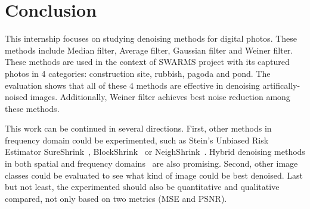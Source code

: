 \chapter{Conclusion}
\label{chapter_5}

This internship focuses on studying denoising methods for digital photos. These methods include Median filter, Average filter, Gaussian filter and Weiner filter. These methods are used in the context of SWARMS project with its captured photos in 4 categories: construction site, rubbish, pagoda and pond. The evaluation shows that all of these 4 methods are effective in denoising artifically-noised images. Additionally, Weiner filter achieves best noise reduction among these methods.

This work can be continued in several directions. First, other methods in frequency domain could be experimented, such as Stein’s Unbiased Risk Estimator SureShrink~\cite{donoho1995noising}, BlockShrink~\cite{4566501} or NeighShrink~\cite{DENGWEN20081694}. Hybrid denoising methods in both spatial and frequency domains~\cite{yue2014cid} are also promising. Second, other image classes could be evaluated to see what kind of image could be best denoised. Last but not least, the experimented should also be quantitative and qualitative compared, not only based on two metrics (MSE and PSNR).